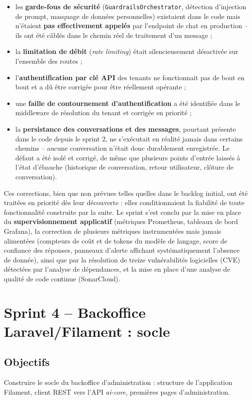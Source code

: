 \begin{itemize}
    \item les \textbf{garde-fous de sécurité} (\texttt{GuardrailsOrchestrator}, détection d'injection de prompt, masquage de données personnelles) existaient dans le code mais n'étaient \textbf{pas effectivement appelés} par l'endpoint de chat en production -- ils ont été câblés dans le chemin réel de traitement d'un message ;
    \item la \textbf{limitation de débit} (\emph{rate limiting}) était silencieusement désactivée sur l'ensemble des routes ;
    \item l'\textbf{authentification par clé API} des tenants ne fonctionnait pas de bout en bout et a dû être corrigée pour être réellement opérante ;
    \item une \textbf{faille de contournement d'authentification} a été identifiée dans le middleware de résolution du tenant et corrigée en priorité ;
    \item la \textbf{persistance des conversations et des messages}, pourtant présente dans le code depuis le sprint 2, ne s'exécutait en réalité jamais dans certains chemins -- aucune conversation n'était donc durablement enregistrée. Le défaut a été isolé et corrigé, de même que plusieurs points d'entrée laissés à l'état d'ébauche (historique de conversation, retour utilisateur, clôture de conversation).
\end{itemize}

Ces corrections, bien que non prévues telles quelles dans le backlog initial, ont été traitées en priorité dès leur découverte : elles conditionnaient la fiabilité de toute fonctionnalité construite par la suite. Le sprint s'est conclu par la mise en place du \textbf{supervisionnement applicatif} (métriques Prometheus, tableaux de bord Grafana), la correction de plusieurs métriques instrumentées mais jamais alimentées (compteurs de coût et de tokens du modèle de langage, score de confiance des réponses, panneaux d'alerte affichant systématiquement l'absence de donnée), ainsi que par la résolution de treize vulnérabilités logicielles (CVE) détectées par l'analyse de dépendances, et la mise en place d'une analyse de qualité de code continue (SonarCloud).

\section{Sprint 4 -- Backoffice Laravel/Filament : socle}

\subsection*{Objectifs}
Construire le socle du backoffice d'administration : structure de l'application Filament, client REST vers l'API \emph{ai-core}, premières pages d'administration.

